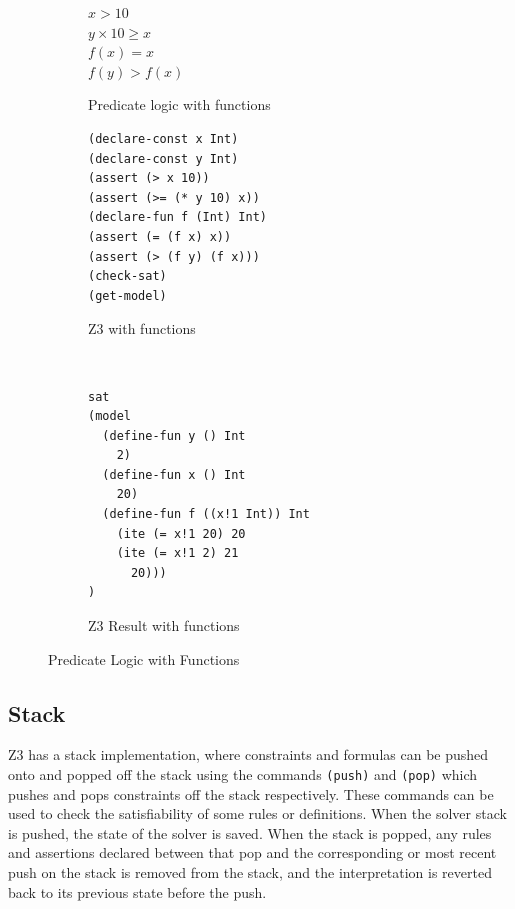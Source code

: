 \documentclass[a4paper]{report}
\begin{document}
\begin{figure}[!htbp]
\centering
\begin{subfigure}[b]{\textwidth}
\centering
$x > 10$ \\
$y \times 10 \geq x$ \\
$f(x) = x$ \\
$f(y) > f(x)$
\caption{Predicate logic with functions}
\label{fig:Predicate logic with functions}
\end{subfigure}
\begin{subfigure}[b]{\textwidth}
\lstset{numbers=left, showspaces=false,
    showstringspaces=false, tabsize=2, breaklines=true,
    xleftmargin=5.0ex,
}
\lstset{basicstyle=\ttfamily}
\centering
\begin{lstlisting}[frame=single]
(declare-const x Int)
(declare-const y Int)
(assert (> x 10))
(assert (>= (* y 10) x))
(declare-fun f (Int) Int)
(assert (= (f x) x))
(assert (> (f y) (f x)))
(check-sat)
(get-model)
\end{lstlisting}
\caption{Z3 with functions}
\label{fig:Z3 with functions}
\end{subfigure}\\
\begin{subfigure}[b]{\textwidth}
\lstset{basicstyle=\ttfamily}
\begin{lstlisting}[frame=single]
sat
(model 
  (define-fun y () Int
    2)
  (define-fun x () Int
    20)
  (define-fun f ((x!1 Int)) Int
    (ite (= x!1 20) 20
    (ite (= x!1 2) 21
      20)))
)
\end{lstlisting}
\caption{Z3 Result with functions}
\label{fig:Z3 Function Result}
\end{subfigure}
\caption{Predicate Logic with Functions}
\label{fig:Predicate Logic with Functions}
\end{figure} 

\newpage

\subsection{Stack}
Z3 has a stack implementation, where constraints and formulas can be pushed onto and popped off the stack using the commands \texttt{(push)} and \texttt{(pop)} which pushes and pops constraints off the stack respectively. These commands can be used to check the satisfiability of some rules or definitions. When the solver stack is pushed, the state of the solver is saved. When the stack is popped, any rules and assertions declared between that pop and the corresponding or most recent push on the stack is removed from the stack, and the interpretation is reverted back to its previous state before the push.\\
\end{document}

